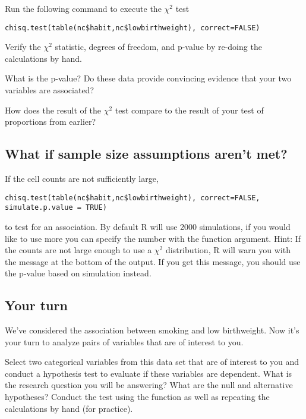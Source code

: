 \documentclass[11pt]{article}
\begin{document}
Run the following command to execute the $\chi^2$ test

\begin{lstlisting}
chisq.test(table(nc$habit,nc$lowbirthweight), correct=FALSE)
\end{lstlisting}

\begin{exercise}
Verify the $\chi^2$ statistic, degrees of freedom, and p-value by re-doing the calculations by hand.
\end{exercise}

\begin{exercise}
What is the p-value?  Do these data provide convincing evidence that your two variables are associated?
\end{exercise}

\begin{exercise}
How does the result of the $\chi^2$ test compare to the result of your test of proportions from earlier?
\end{exercise}

\subsection*{What if sample size assumptions aren't met?}

If the cell counts are not sufficiently large, 

\begin{lstlisting}
chisq.test(table(nc$habit,nc$lowbirthweight), correct=FALSE, 
simulate.p.value = TRUE)
\end{lstlisting}

to test for an association. By default R will use 2000 simulations, if you would like to use more you can specify the number with the  function argument. Hint:  If the counts are not large enough to use a $\chi^2$ distribution, R will warn you with the message  at the bottom of the output. If you get this message, you should use the p-value based on simulation instead.

\subsection*{Your turn}

We've considered the association between smoking and low birthweight.  Now it's your turn to analyze pairs of variables that are of interest to you.

\begin{exercise}
Select two categorical variables from this data set that are of interest to you and conduct a hypothesis test to evaluate if these variables are dependent. What is the research question you will be answering?  What are the null and alternative hypotheses? Conduct the test using the  function as well as repeating the calculations by hand (for practice).
\end{exercise}
\end{document}
